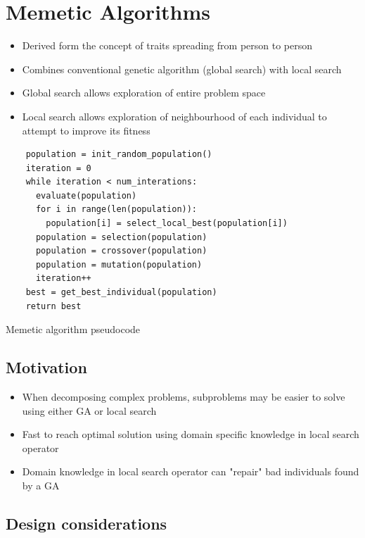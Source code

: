\documentclass[a4paper]{article}
\begin{document}
\section{Memetic Algorithms}
\label{sec:ma}

\begin{itemize}
  \item Derived form the concept of traits spreading from person to person
  \item Combines conventional genetic algorithm (global search) with local
        search
  \item Global search allows exploration of entire problem space
  \item Local search allows exploration of neighbourhood of each individual to
        attempt to improve its fitness
\end{itemize}


\begin{listing}[h]
  \begin{verbatim}
    population = init_random_population()
    iteration = 0
    while iteration < num_interations:
      evaluate(population)
      for i in range(len(population)):
        population[i] = select_local_best(population[i])
      population = selection(population)
      population = crossover(population)
      population = mutation(population)
      iteration++
    best = get_best_individual(population)
    return best
  \end{verbatim}
  \caption{Memetic algorithm pseudocode}
  \label{listing:ma_pseudocode}
\end{listing}

\subsection{Motivation}

\begin{itemize}
  \item When decomposing complex problems, subproblems may be easier to solve
        using either GA or local search
  \item Fast to reach optimal solution using domain specific knowledge in local
        search operator
  \item Domain knowledge in local search operator can "repair" bad individuals
        found by a GA
\end{itemize}

\subsection{Design considerations}
\end{document}
